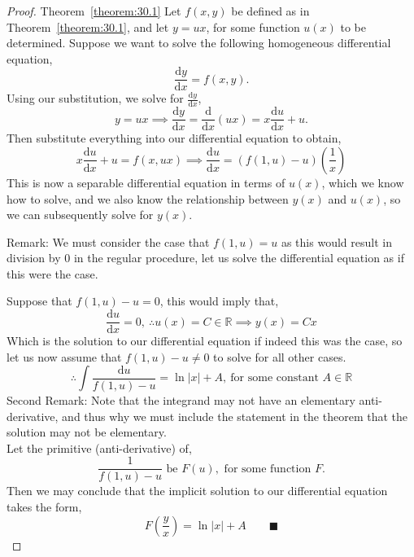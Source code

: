 \begin{proof}{Theorem~\ref{theorem:30.1}}
Let $f(x,y)$ be defined as in Theorem~\ref{theorem:30.1}, and let $y=ux$, for some function $u(x)$ to be determined. Suppose we want to solve the following homogeneous differential equation,
$$\frac{\mathrm{d}y}{\mathrm{d}x}=f(x,y)\text{.}$$
Using our substitution, we solve for $\frac{\mathrm{d}y}{\mathrm{d}x}$,
$$y=ux \implies \frac{\mathrm{d}y}{\mathrm{d}x}=\frac{\mathrm{d}}{\mathrm{d}x}(ux)=x\frac{\mathrm{d}u}{\mathrm{d}x}+u\text{.}$$
Then substitute everything into our differential equation to obtain,
$$x\frac{\mathrm{d}u}{\mathrm{d}x}+u=f(x,ux) \implies \frac{\mathrm{d}u}{\mathrm{d}x}=(f(1,u)-u)\left(\frac{1}{x}\right)$$
This is now a separable differential equation in terms of $u(x)$, which we know how to solve, and we also know the relationship between $y(x)$ and $u(x)$, so we can subsequently solve for $y(x)$.
\smallskip

Remark: We must consider the case that $f(1,u)=u$ as this would result in division by $0$ in the regular procedure, let us solve the differential equation as if this were the case.
\smallskip

Suppose that $f(1,u)-u=0$, this would imply that,
$$\frac{\mathrm{d}u}{\mathrm{d}x}=0, \ \therefore u(x)=C \in \mathbb{R} \implies y(x)=Cx$$
Which is the solution to our differential equation if indeed this was the case, so let us now assume that $f(1,u)-u \neq 0$ to solve for all other cases.
$$\therefore \int \frac{\mathrm{d}u}{f(1,u)-u}=\ln|x|+A, \ \text{for some constant $A \in \mathbb{R}$}$$
Second Remark: Note that the integrand may not have an elementary anti-derivative, and thus why we must include the statement in the theorem that the solution may not be elementary. \\
Let the primitive (anti-derivative) of,
$$\frac{1}{f(1,u)-u} \text{ be } F(u), \text{ for some function $F$.}$$
Then we may conclude that the implicit solution to our differential equation takes the form,
$$F\left(\frac{y}{x}\right)=\ln|x|+A \qquad\blacksquare$$
\end{proof}

